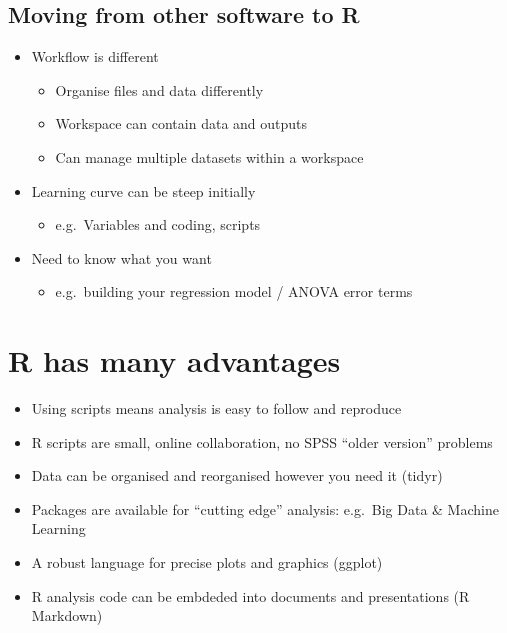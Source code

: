 \documentclass[
]{book}
\providecommand{\tightlist}{%
  \setlength{\itemsep}{0pt}\setlength{\parskip}{0pt}}
\begin{document}
\hypertarget{moving-from-other-software-to-r}{%
\subsection{Moving from other software to R}\label{moving-from-other-software-to-r}}

\begin{itemize}
\tightlist
\item
  Workflow is different

  \begin{itemize}
  \tightlist
  \item
    Organise files and data differently
  \item
    Workspace can contain data and outputs
  \item
    Can manage multiple datasets within a workspace
  \end{itemize}
\item
  Learning curve can be steep initially

  \begin{itemize}
  \tightlist
  \item
    e.g.~Variables and coding, scripts
  \end{itemize}
\item
  Need to know what you want

  \begin{itemize}
  \tightlist
  \item
    e.g.~building your regression model / ANOVA error terms
  \end{itemize}
\end{itemize}

\hypertarget{r-has-many-advantages}{%
\section{R has many advantages}\label{r-has-many-advantages}}

\begin{itemize}
\tightlist
\item
  Using scripts means analysis is easy to follow and reproduce
\item
  R scripts are small, online collaboration, no SPSS ``older version'' problems
\item
  Data can be organised and reorganised however you need it (tidyr)
\item
  Packages are available for ``cutting edge'' analysis: e.g.~Big Data \& Machine Learning
\item
  A robust language for precise plots and graphics (ggplot)
\item
  R analysis code can be embdeded into documents and presentations (R Markdown)
\end{itemize}
\end{document}
